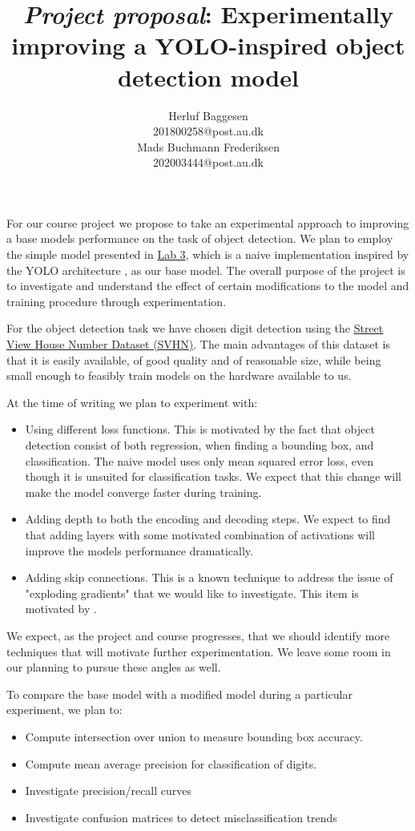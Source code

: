 \documentclass{article}
\title{\emph{Project proposal}: Experimentally improving a YOLO-inspired object detection model}
\author{
	Herluf Baggesen \\
	201800258@post.au.dk \\
	\And
	Mads Buchmann Frederiksen \\
	202003444@post.au.dk\\
}
\date{}
\begin{document}
\maketitle

For our course project we propose to take an experimental approach to improving a base models performance on the task of object detection. We plan to employ the simple model presented in \href{https://github.com/klaverhenrik/Deep-Learing-for-Visual-Recognition-2022/blob/main/Lab3_FunWithMNIST.ipynb}{Lab 3}, which is a naive implementation inspired by the YOLO architecture \citep{YOLO}, as our base model. The overall purpose of the project is to investigate and understand the effect of certain modifications to the model and training procedure through experimentation. 

For the object detection task we have chosen digit detection using the \href{http://ufldl.stanford.edu/housenumbers/}{Street View House Number Dataset (SVHN)}. The main advantages of this dataset is that it is easily available, of good quality and of reasonable size, while being small enough to feasibly train models on the hardware available to us.

At the time of writing we plan to experiment with:
\begin{itemize}
\item Using different loss functions. This is motivated by the fact that object detection consist of both regression, when finding a bounding box, and classification. The naive model uses only mean squared error loss, even though it is unsuited for classification tasks. We expect that this change will make the model converge faster during training.
\item Adding depth to both the encoding and decoding steps. We expect to find that adding layers with some motivated combination of activations will improve the models performance dramatically.
\item Adding skip connections. This is a known technique to address the issue of "exploding gradients" that we would like to investigate. This item is motivated by \citep{SGP}.
\end{itemize}

We expect, as the project and course progresses, that we should identify more techniques that will motivate further experimentation. We leave some room in our planning to pursue these angles as well. 

To compare the base model with a modified model during a particular experiment, we plan to:
\begin{itemize}
	\item Compute intersection over union to measure bounding box accuracy.
	\item Compute mean average precision for classification of digits.
	\item Investigate precision/recall curves
	\item Investigate confusion matrices to detect misclassification trends
\end{itemize}
\end{document}
